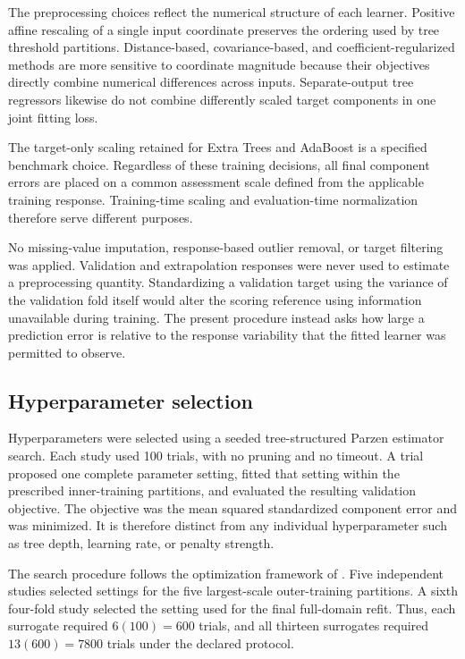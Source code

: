 The preprocessing choices reflect the numerical structure of each learner. Positive affine rescaling of a single input coordinate preserves the ordering used by tree threshold partitions. Distance-based, covariance-based, and coefficient-regularized methods are more sensitive to coordinate magnitude because their objectives directly combine numerical differences across inputs. Separate-output tree regressors likewise do not combine differently scaled target components in one joint fitting loss.

The target-only scaling retained for Extra Trees and AdaBoost is a specified benchmark choice. Regardless of these training decisions, all final component errors are placed on a common assessment scale defined from the applicable training response. Training-time scaling and evaluation-time normalization therefore serve different purposes.

No missing-value imputation, response-based outlier removal, or target filtering was applied. Validation and extrapolation responses were never used to estimate a preprocessing quantity. Standardizing a validation target using the variance of the validation fold itself would alter the scoring reference using information unavailable during training. The present procedure instead asks how large a prediction error is relative to the response variability that the fitted learner was permitted to observe.

\subsection{Hyperparameter selection}

Hyperparameters were selected using a seeded tree-structured Parzen estimator search. Each study used 100 trials, with no pruning and no timeout. A trial proposed one complete parameter setting, fitted that setting within the prescribed inner-training partitions, and evaluated the resulting validation objective. The objective was the mean squared standardized component error and was minimized. It is therefore distinct from any individual hyperparameter such as tree depth, learning rate, or penalty strength.

The search procedure follows the optimization framework of \citet{Akiba2019}. Five independent studies selected settings for the five largest-scale outer-training partitions. A sixth four-fold study selected the setting used for the final full-domain refit. Thus, each surrogate required
$6(100)=600$
trials, and all thirteen surrogates required
$13(600)=7800$
trials under the declared protocol.


